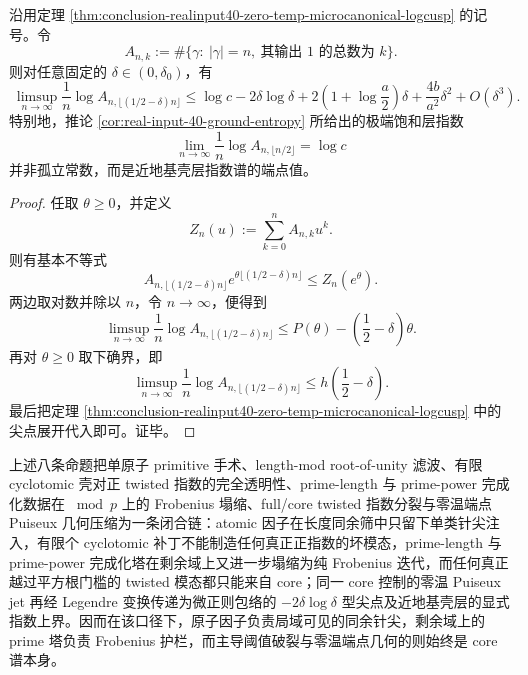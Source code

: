 \begin{corollary}[近地基壳层的显式指数上界]\label{cor:conclusion-realinput40-near-ground-shell-exponential-bound}
沿用定理 \ref{thm:conclusion-realinput40-zero-temp-microcanonical-logcusp} 的记号。令
\[
A_{n,k}
:=
\#\{\gamma:\ |\gamma|=n,\ \text{其输出 }1\text{ 的总数为 }k\}.
\]
则对任意固定的 \(\delta\in(0,\delta_0)\)，有
\[
\boxed{\;
\limsup_{n\to\infty}
\frac1n\log A_{n,\lfloor(1/2-\delta)n\rfloor}
\le
\log c
-2\delta\log\delta
+2\left(1+\log\frac{a}{2}\right)\delta
+\frac{4b}{a^2}\delta^2
+O(\delta^3).
\;}
\]
特别地，推论 \ref{cor:real-input-40-ground-entropy} 所给出的极端饱和层指数
\[
\lim_{n\to\infty}\frac1n\log A_{n,\lfloor n/2\rfloor}=\log c
\]
并非孤立常数，而是近地基壳层指数谱的端点值。
\end{corollary}
\begin{proof}
任取 \(\theta\ge 0\)，并定义
\[
Z_n(u):=\sum_{k=0}^{n}A_{n,k}u^k.
\]
则有基本不等式
\[
A_{n,\lfloor(1/2-\delta)n\rfloor}e^{\theta\lfloor(1/2-\delta)n\rfloor}
\le
Z_n(e^\theta).
\]
两边取对数并除以 \(n\)，令 \(n\to\infty\)，便得到
\[
\limsup_{n\to\infty}\frac1n\log A_{n,\lfloor(1/2-\delta)n\rfloor}
\le
P(\theta)-\left(\frac12-\delta\right)\theta.
\]
再对 \(\theta\ge 0\) 取下确界，即
\[
\limsup_{n\to\infty}\frac1n\log A_{n,\lfloor(1/2-\delta)n\rfloor}
\le
h\!\left(\frac12-\delta\right).
\]
最后把定理 \ref{thm:conclusion-realinput40-zero-temp-microcanonical-logcusp} 中的尖点展开代入即可。证毕。
\end{proof}

上述八条命题把单原子 primitive 手术、length-mod root-of-unity 滤波、有限 cyclotomic 壳对正 twisted 指数的完全透明性、prime-length 与 prime-power 完成化数据在 \(\bmod p\) 上的 Frobenius 塌缩、full/core twisted 指数分裂与零温端点 Puiseux 几何压缩为一条闭合链：atomic 因子在长度同余筛中只留下单类针尖注入，有限个 cyclotomic 补丁不能制造任何真正正指数的坏模态，prime-length 与 prime-power 完成化塔在剩余域上又进一步塌缩为纯 Frobenius 迭代，而任何真正越过平方根门槛的 twisted 模态都只能来自 core；同一 core 控制的零温 Puiseux jet 再经 Legendre 变换传递为微正则包络的 \(-2\delta\log\delta\) 型尖点及近地基壳层的显式指数上界。因而在该口径下，原子因子负责局域可见的同余针尖，剩余域上的 prime 塔负责 Frobenius 护栏，而主导阈值破裂与零温端点几何的则始终是 core 谱本身。

\endinput
